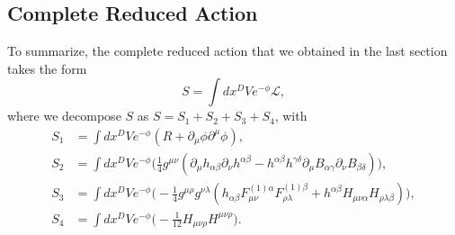 \documentclass{article}
\begin{document}
\subsection{Complete Reduced Action}
To summarize, the complete reduced action that we obtained in the last section takes the form
\begin{equation}
    S =  \int dx^D Ve^{-\phi} \mathcal{L},
\end{equation}
where we decompose $S$ as $S =  S_1 + S_2 + S_3 +S_4$, with
\begin{equation} \label{eq:38}
    \boxed{
    \begin{aligned}
        S_1 &=\int dx^D Ve^{-\phi}(R +\partial_{\mu }\phi \partial^{\mu} \phi),\\
        S_2 &=\int dx^D Ve^{-\phi}\Big(\frac{1}{4}g^{\mu \nu }(\partial_\mu h_{\alpha \beta}\partial_\nu h^{\alpha \beta} - h^{\alpha \beta } h^{\gamma \delta}\partial_\mu B_{\alpha \gamma} \partial_\nu B_{\beta \delta})\Big),\\
        S_3 &= \int dx^DVe^{-\phi}\Big(-\frac{1}{4}g^{\mu \rho}g^{\nu \lambda}(h_{\alpha\beta}F^{(1)\alpha}_{\mu \nu}F^{(1)\beta}_{\rho \lambda}+h^{\alpha \beta}H_{\mu \nu \alpha}H_{\rho \lambda \beta })\Big),\\
        S_4 &=\int dx^D Ve^{-\phi}\Big(-\frac{1}{12}H_{\mu \nu \rho} H^{\mu \nu \rho}\Big).
    \end{aligned}}
\end{equation}
\end{document}
